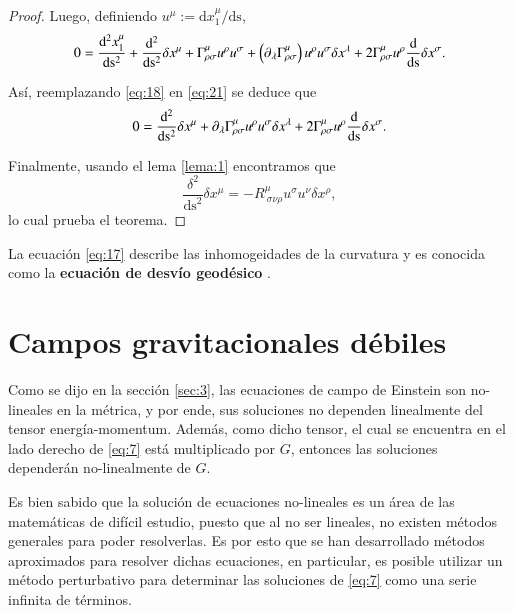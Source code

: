 \begin{proof}
Luego, definiendo $u^{\mu} := \mathrm{d} x^{\mu}_1 / \mathrm{ds}$,
\begin{equation}
\label{eq:21}
0 = \dv[2]{x_1^{\mu}}{\mathrm{s}} + \dv[2]{ }{\mathrm{s}} \delta x^{\mu} + \Gamma^{\mu}_{\rho \sigma} u^{\rho} u^{\sigma} + \left( \partial_{\lambda} \Gamma^{\mu}_{\rho \sigma} \right) u^{\rho} u^{\sigma} \delta x^{\lambda} + 2 \Gamma^{\mu}_{\rho \sigma} u^{\rho} \dv{ }{\mathrm{s}} \delta x^{\sigma}. 
\end{equation}

Así, reemplazando \eqref{eq:18} en \eqref{eq:21} se deduce que
\begin{equation}
0 = \dv[2]{ }{\mathrm{s}} \delta x^{\mu} + \partial_{\lambda} \Gamma^{\mu}_{\rho \sigma} u^{\rho} u^{\sigma} \delta x^{\lambda} + 2 \Gamma^{\mu}_{\rho \sigma} u^{\rho} \dv{ }{\mathrm{s}} \delta x^{\sigma}.
\end{equation}

Finalmente, usando el lema \ref{lema:1} encontramos que
\begin{equation}
\frac{\delta^2}{\mathrm{ds}^2}\delta x^{\mu} = - R^{\mu}_{\ \sigma \nu \rho} u^{\sigma} u^{\nu} \delta x^{\rho},
\end{equation}
lo cual prueba el teorema.
\end{proof}

La ecuación \eqref{eq:17} describe las inhomogeidades de la curvatura y es conocida como la \textbf{ecuación de desvío geodésico} \cite{Ciufolini}.

\section{Campos gravitacionales débiles}

Como se dijo en la sección \ref{sec:3}, las ecuaciones de campo de Einstein son no-lineales en la métrica, y por ende, sus soluciones no dependen linealmente del tensor energía-momentum. Además, como dicho tensor, el cual se encuentra en el lado derecho de \eqref{eq:7} está multiplicado por $G$, entonces las soluciones dependerán no-linealmente de $G$.

Es bien sabido que la solución de ecuaciones no-lineales es un área de las matemáticas de difícil estudio, puesto que al no ser lineales, no existen métodos generales para poder resolverlas. Es por esto que se han desarrollado métodos aproximados para resolver dichas ecuaciones, en particular, es posible utilizar un método perturbativo para determinar las soluciones de \eqref{eq:7} como una serie infinita de términos.

